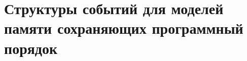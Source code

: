 \chapter{Структуры событий для моделей памяти сохраняющих программный порядок}
\label{ch:porf-evenstruct}

